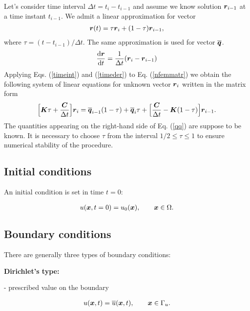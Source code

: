 Let's consider time interval $\Delta t = t_i- t_{i-1}$ and assume we know solution 
$\mbox{\boldmath$r$}_{i-1}$ at a time instant $t_{i-1}$. We admit a linear approximation for vector 
\begin{eqnarray}\label{timeint}
\mbox{\boldmath$r$}(t) = \tau \mbox{\boldmath$r$}_i + (1-\tau)\mbox{\boldmath$r$}_{i-1},
\end{eqnarray}
where $\tau = (t - t_{i-1})/\Delta t$. The same approximation is used for 
vector $\overline{\mbox{\boldmath$q$}}$. 
\begin{eqnarray}\label{timeder}
\frac{{\rm d} \mbox{\boldmath$r$}}{{\rm d}t} =  \frac{1}{\Delta t}(\mbox{\boldmath$r$}_i-\mbox{\boldmath$r$}_{i-1})
\end{eqnarray}
Applying Eqs. (\ref{timeint}) and (\ref{timeder}) to Eq. (\ref{nfemmatr}) we obtain the following 
system of linear equations for unknown vector $\mbox{\boldmath$r$}_i$ written in the matrix form
\begin{eqnarray}\label{qq}
\Big[\mbox{\boldmath$K$}\tau + \frac{\mbox{\boldmath$C$}}{\Delta t} \Big] \mbox{\boldmath$r$}_i = \overline{\mbox{\boldmath$q$}}_{i-1}(1-\tau) + \overline{\mbox{\boldmath$q$}}_i\tau + 
\Big[\frac{\mbox{\boldmath$C$}}{\Delta t} - \mbox{\boldmath$K$}(1-\tau) \Big] \mbox{\boldmath$r$}_{i-1}.
\end{eqnarray}
The quantities appearing on the right-hand side of Eq. (\ref{qq}) are suppose to be known.
It is necessary to choose $\tau$ from the interval $1/2 \le \tau \le 1$ to ensure numerical 
stability of the procedure.

\subsection{Initial conditions}

An initial condition is set in time $t = 0$:

\begin{eqnarray}
u(\mbox{\boldmath$x$},t = 0) = u_0(\mbox{\boldmath$x$}), \qquad \mbox{\boldmath$x$} \in \Omega. \nonumber
\end{eqnarray}

\subsection{Boundary conditions}

There are generally three types of boundary conditions:

{\bf Dirichlet's type:}

- prescribed value on the boundary

\begin{eqnarray}
u(\mbox{\boldmath$x$},t) = \overline{u}(\mbox{\boldmath$x$},t), \qquad \mbox{\boldmath$x$} \in \Gamma_u. \nonumber
\end{eqnarray}


